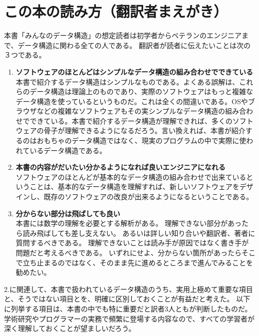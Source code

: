 \chapter*{この本の読み方（翻訳者まえがき）}

本書「みんなのデータ構造」の想定読者は初学者からベテランのエンジニアまで、データ構造に関わる全ての人である。
翻訳者が読者に伝えたいことは次の３つである。

\begin{enumerate}
\item {\bf ソフトウェアのほとんどはシンプルなデータ構造の組み合わせでできている} \\
本書で紹介するデータ構造はシンプルなものである。よくある誤解は、これらのデータ構造は理論上のものであり、実際のソフトウェアはもっと複雑なデータ構造を使っているというものだ。これは全くの間違いである。OSやブラウザなどの複雑なソフトウェアもその実シンプルなデータ構造の組み合わせでできている。本書で紹介するデータ構造が理解できれば、多くのソフトウェアの骨子が理解できるようになるだろう。言い換えれば、本書が紹介するのはおもちゃのデータ構造ではなく、現実のプログラムの中で実際に使われているデータ構造である。%

\item {\bf 本書の内容がだいたい分かるようになれば良いエンジニアになれる} \\
ソフトウェアのほとんどが基本的なデータ構造の組み合わせで出来ているということは、基本的なデータ構造を理解すれば、新しいソフトウェアをデザインし、既存のソフトウェアの改良が出来るようになるということである。

\item {\bf 分からない部分は飛ばしても良い} \\
本書には数学の理解を必要とする解析がある。
理解できない部分があったら読み飛ばしても差し支えない。
あるいは詳しい知り合いや翻訳者、著者に質問するべきである。
理解できないことは読み手が原因ではなく書き手が問題だと考えるべきである。
いずれにせよ、分からない箇所があったらそこで立ち止まるのではなく、そのまま先に進めるところまで進んでみることを勧めたい。

\end{enumerate}

2.に関連して、本書で扱われているデータ構造のうち、実用上極めて重要な項目と、そうではない項目とを、明確に区別しておくことが有益だと考えた。
以下に列挙する項目は、本書の中でも特に重要だと訳者3人ともが判断したものだ。
学術研究やプログラマーの実務で頻繁に登場する内容なので、すべての学習者が深く理解しておくことが望ましいだろう。


